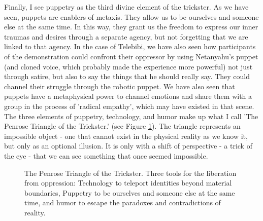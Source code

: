 \documentclass[dissertation,math,vertlayout,pdfa,colorlinks]{aaltoseries}
\begin{document}
Finally, I see puppetry as the third divine element of the trickster. As we have seen, puppets are enablers of metaxis. They allow us to be ourselves and someone else at the same time. In this way, they grant us the freedom to express our inner traumas and desires through a separate agency, but not forgetting that we are linked to that agency. In the case of Telebibi, we have also seen how participants of the demonstration could confront their oppressor by using Netanyahu's puppet (and cloned voice, which probably made the experience more powerful) not just through satire, but also to say the things that he should really say. They could channel their struggle through the robotic puppet. We have also seen that puppets have a metaphysical power to channel emotions and share them with a group in the process of 'radical empathy', which may have existed in that scene. The three elements of puppetry, technology, and humor make up what I call 'The Penrose Triangle of the Trickster.' (see Figure \ref{fig:penrose-trickster}). The triangle represents an impossible object \cite{penroseImpossibleObjectsSpecial1958} - one that cannot exist in the physical reality as we know it, but only as an optional illusion. It is only with a shift of perspective - a trick of the eye -  that we can see something that once seemed impossible.

\begin{figure}
    \centering
    
    \caption{The Penrose Triangle of the Trickster. Three tools for the liberation from oppression: Technology to teleport identities beyond material boundaries, Puppetry to be ourselves and someone else at the same time, and humor to escape the paradoxes and contradictions of reality.}
    \label{fig:penrose-trickster}
\end{figure}

\pagebreak


\end{document}

